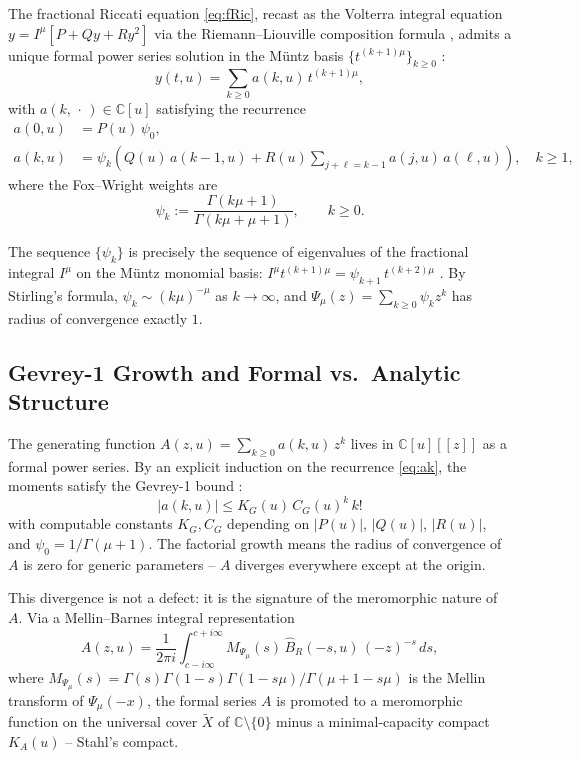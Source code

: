 \documentclass{article}
\newcommand{\C}{\mathbb{C}}
\begin{document}
The fractional Riccati equation \eqref{eq:fRic}, recast as the Volterra
integral equation $y = I^\mu[P + Qy + Ry^2]$ via the Riemann--Liouville
composition formula \cite{SKM1993}, admits a unique formal power series
solution in the Müntz basis $\{t^{(k+1)\mu}\}_{k \ge 0}$
\cite{Crowley2026}:
\begin{equation}\label{eq:y_expansion}
  y(t,u) = \sum_{k \ge 0} a(k,u)\,t^{(k+1)\mu},
\end{equation}
with $a(k,\,\cdot\,) \in \C[u]$ satisfying the recurrence
\begin{align}
  a(0,u) &= P(u)\,\psi_{0}, \label{eq:a0}\\
  a(k,u) &= \psi_{k}\!\left(Q(u)\,a(k-1,u)
    + R(u)\sum_{j+\ell=k-1} a(j,u)\,a(\ell,u)\right), \quad k\ge 1,
    \label{eq:ak}
\end{align}
where the Fox--Wright weights are
\begin{equation}\label{eq:psi}
  \psi_k := \frac{\Gamma(k\mu+1)}{\Gamma(k\mu+\mu+1)}, \qquad k \ge 0.
\end{equation}

The sequence $\{\psi_k\}$ is precisely the sequence of eigenvalues of the
fractional integral $I^\mu$ on the Müntz monomial basis: $I^\mu
t^{(k+1)\mu} = \psi_{k+1}\,t^{(k+2)\mu}$ \cite{Crowley2026}. By Stirling's
formula, $\psi_k \sim (k\mu)^{-\mu}$ as $k\to\infty$, and $\Psi_\mu(z)
= \sum_{k\ge 0}\psi_k z^k$ has radius of convergence exactly $1$.

\subsection{Gevrey-1 Growth and Formal vs.\ Analytic Structure}

The generating function $A(z,u) = \sum_{k\ge 0} a(k,u)\,z^k$ lives in
$\C[u][[z]]$ as a formal power series. By an explicit induction on the
recurrence \eqref{eq:ak}, the moments satisfy the Gevrey-1 bound
\cite{Crowley2026}:
\begin{equation}\label{eq:gevrey}
  |a(k,u)| \le K_G(u)\,C_G(u)^k\,k!
\end{equation}
with computable constants $K_G, C_G$ depending on $|P(u)|$, $|Q(u)|$,
$|R(u)|$, and $\psi_0 = 1/\Gamma(\mu+1)$. The factorial growth means the
radius of convergence of $A$ is zero for generic parameters -- $A$ diverges
everywhere except at the origin.

This divergence is not a defect: it is the signature of the meromorphic
nature of $A$. Via a Mellin--Barnes integral representation \cite{Crowley2026}
\begin{equation}\label{eq:MB}
  A(z,u) = \frac{1}{2\pi i}\int_{c-i\infty}^{c+i\infty}
  M_{\Psi_\mu}(s)\,\widehat{B}_R(-s,u)\,(-z)^{-s}\,ds,
\end{equation}
where $M_{\Psi_\mu}(s) = \Gamma(s)\Gamma(1-s)\Gamma(1-s\mu)/\Gamma(\mu{+}1-s\mu)$
is the Mellin transform of $\Psi_\mu(-x)$, the formal series $A$ is promoted
to a meromorphic function on the universal cover $\widetilde{X}$ of $\C
\setminus \{0\}$ minus a minimal-capacity compact $K_A(u)$ -- Stahl's compact.
\end{document}
